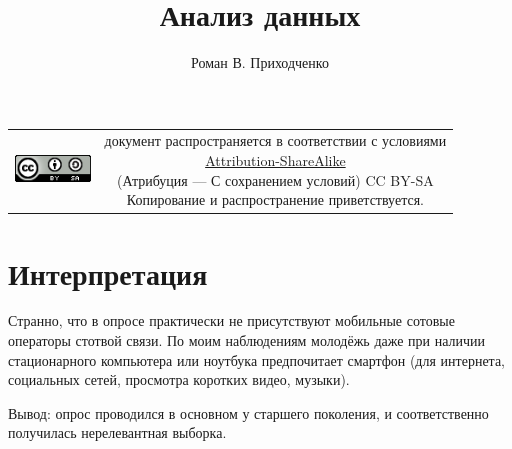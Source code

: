 \documentclass[unicode, 12pt, a4paper,oneside,fleqn]{article}
\author{Роман В. Приходченко}
\title{Анализ данных}
\begin{document}
\renewcommand\bibname{СПИСОК ЛИТЕРАТУРЫ}
\renewcommand\refname{\centering Список литературы}
\renewcommand\contentsname{\centering Содержание}



\makeatletter %
\maketitle

\begin{table}[ht]
  \begin{tabular}{cc}
    \includegraphics[width=2cm]{../CC_BY-SA_88x31.png} &
    \shortstack{документ распространяется в соответствии с
      условиями\\
      \href{http://creativecommons.org/licenses/by-sa/3.0/}{Attribution-ShareAlike} \\
      (Атрибуция — С сохранением условий) CC BY-SA \\
      Копирование и распространение приветствуется.}
  \end{tabular}
\end{table}

\newpage
\tableofcontents

\newpage

\section{Интерпретация}
Странно, что в опросе практически не присутствуют мобильные сотовые
операторы стотвой связи. По моим наблюдениям молодёжь даже при наличии
стационарного компьютера или ноутбука предпочитает смартфон (для
интернета, социальных сетей, просмотра коротких видео, музыки).

Вывод: опрос проводился в основном у старшего поколения, и
соответственно получилась нерелевантная выборка.
\end{document}
